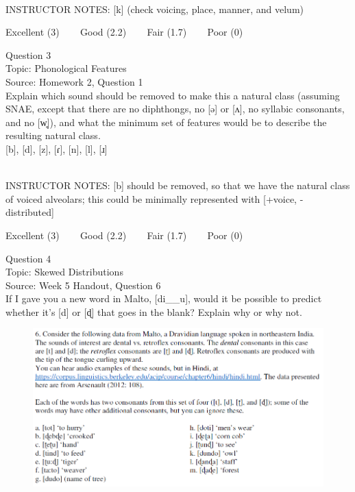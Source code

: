 \documentclass[12pt]{article}
\begin{document}
~\\
INSTRUCTOR NOTES: [k] (check voicing, place, manner, and velum)


\vfill
Excellent (3) ~~~ Good (2.2) ~~~ Fair (1.7) ~~~ Poor (0)
\newpage

{\large Question 3}\\

Topic: Phonological Features\\
Source: Homework 2, Question 1\\

Explain which sound should be removed to make this a natural class (assuming SNAE, except that there are no diphthongs, no [ə] or [ʌ], no syllabic consonants, and no [w̥]), and what the minimum set of features would be to describe the resulting natural class.\\

{[b]}, {[d]}, {[z]}, {[ɾ]}, {[n]}, {[l]}, {[ɹ]}


~\\
INSTRUCTOR NOTES: [b] should be removed, so that we have the natural class of voiced alveolars; this could be minimally represented with [+voice, -distributed]


\vfill
Excellent (3) ~~~ Good (2.2) ~~~ Fair (1.7) ~~~ Poor (0)
\newpage

{\large Question 4}\\

Topic: Skewed Distributions\\
Source: Week 5 Handout, Question 6\\

If I gave you a new word in Malto, [di\_\_u], would it be possible to predict whether it's [d] or [ɖ] that goes in the blank? Explain why or why not.\\

\begin{figure}[H]
\includegraphics{../images/malto.png}
\end{figure}
\end{document}
